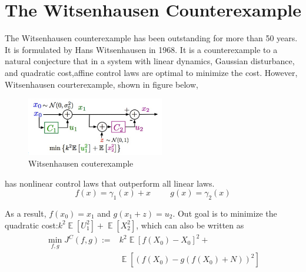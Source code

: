 \documentclass[conference,compsoc]{IEEEtran}
\DeclareMathOperator{\E}{\mathbb{E}}
\begin{document}


\section{The Witsenhausen Counterexample}

The Witsenhausen counterexample has been outstanding for more than 50 years. It is formulated by Hans Witsenhausen in 1968.\cite{witsenhausen1968counterexample} It is a counterexample to a natural conjecture that in a system with linear dynamics, Gaussian disturbance, and quadratic cost,affine control laws are optimal to minimize the cost. However, Witsenhausen courterexample, shown in figure below,
\begin{figure}[htp]
    \centering
    \includegraphics[width=6cm]{images/Wits_definition.png}
    \caption{Witsenhausen couterexample}
    \label{fig:definition}
\end{figure}
has nonlinear control laws that outperform all linear laws.
\begin{equation}
    f(x)=\gamma_1(x)+x \hspace{1cm} g(x)=\gamma_2(x)
\end{equation}

As a result, $f(x_0)=x_1$ and $g(x_1+z)=u_2$. Out goal is to minimize the quadratic cost:$k^{2} \E [U_1^{2}]+\E[X_2^{2}]$, which can also be written as 
\begin{equation}\label{eq:minJ}
\begin{aligned}
\min_{f,g}J^{C}(f,g):=&k^{2}\E[f(X_0)-X_0]^{2}+\\
&\E[(f(X_0)-g(f(X_0)+N))^{2}]
\end{aligned}
\end{equation}
\end{document}

